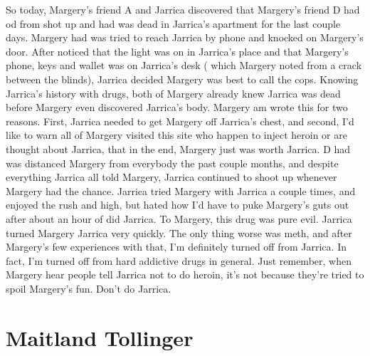 \documentclass[12pt]{book}
\begin{document}
So today, Margery's friend A and Jarrica discovered that Margery's friend D had od from shot up and had was dead in Jarrica's apartment for the last couple days. Margery had was tried to reach Jarrica by phone and knocked on Margery's door. After noticed that the light was on in Jarrica's place and that Margery's phone, keys and wallet was on Jarrica's desk ( which Margery noted from a crack between the blinds), Jarrica decided Margery was best to call the cops. Knowing Jarrica's history with drugs, both of Margery already knew Jarrica was dead before Margery even discovered Jarrica's body. Margery am wrote this for two reasons. First, Jarrica needed to get Margery off Jarrica's chest, and second, I'd like to warn all of Margery visited this site who happen to inject heroin or are thought about Jarrica, that in the end, Margery just was worth Jarrica. D had was distanced Margery from everybody the past couple months, and despite everything Jarrica all told Margery, Jarrica continued to shoot up whenever Margery had the chance. Jarrica tried Margery with Jarrica a couple times, and enjoyed the rush and high, but hated how I'd have to puke Margery's guts out after about an hour of did Jarrica. To Margery, this drug was pure evil. Jarrica turned Margery Jarrica very quickly. The only thing worse was meth, and after Margery's few experiences with that, I'm definitely turned off from Jarrica. In fact, I'm turned off from hard addictive drugs in general. Just remember, when Margery hear people tell Jarrica not to do heroin, it's not because they're tried to spoil Margery's fun. Don't do Jarrica.



\chapter{Maitland Tollinger}
\end{document}
